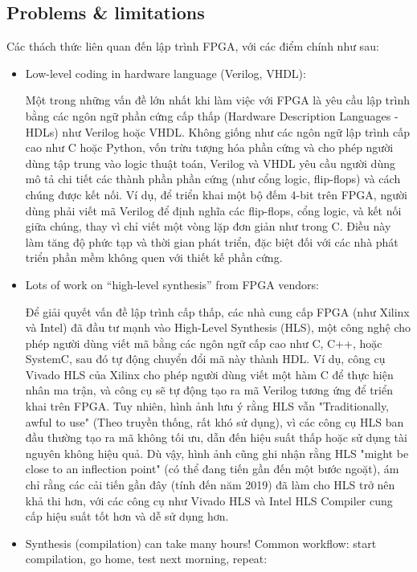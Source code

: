 \documentclass[a4paper]{article}
\begin{document}
\subsection{Problems \& limitations}
Các thách thức liên quan đến lập trình FPGA, với các điểm chính như sau:
\begin{itemize}
    \item Low-level coding in hardware language (Verilog, VHDL):\par Một trong những vấn đề lớn nhất khi làm việc với FPGA là yêu cầu lập trình bằng các ngôn ngữ phần cứng cấp thấp (Hardware Description Languages - HDLs) như Verilog hoặc VHDL. Không giống như các ngôn ngữ lập trình cấp cao như C hoặc Python, vốn trừu tượng hóa phần cứng và cho phép người dùng tập trung vào logic thuật toán, Verilog và VHDL yêu cầu người dùng mô tả chi tiết các thành phần phần cứng (như cổng logic, flip-flops) và cách chúng được kết nối. Ví dụ, để triển khai một bộ đếm 4-bit trên FPGA, người dùng phải viết mã Verilog để định nghĩa các flip-flops, cổng logic, và kết nối giữa chúng, thay vì chỉ viết một vòng lặp đơn giản như trong C. Điều này làm tăng độ phức tạp và thời gian phát triển, đặc biệt đối với các nhà phát triển phần mềm không quen với thiết kế phần cứng.
    \item Lots of work on “high-level synthesis” from FPGA vendors: \par Để giải quyết vấn đề lập trình cấp thấp, các nhà cung cấp FPGA (như Xilinx và Intel) đã đầu tư mạnh vào High-Level Synthesis (HLS), một công nghệ cho phép người dùng viết mã bằng các ngôn ngữ cấp cao như C, C++, hoặc SystemC, sau đó tự động chuyển đổi mã này thành HDL. Ví dụ, công cụ Vivado HLS của Xilinx cho phép người dùng viết một hàm C để thực hiện nhân ma trận, và công cụ sẽ tự động tạo ra mã Verilog tương ứng để triển khai trên FPGA. Tuy nhiên, hình ảnh lưu ý rằng HLS vẫn "Traditionally, awful to use" (Theo truyền thống, rất khó sử dụng), vì các công cụ HLS ban đầu thường tạo ra mã không tối ưu, dẫn đến hiệu suất thấp hoặc sử dụng tài nguyên không hiệu quả. Dù vậy, hình ảnh cũng ghi nhận rằng HLS "might be close to an inflection point" (có thể đang tiến gần đến một bước ngoặt), ám chỉ rằng các cải tiến gần đây (tính đến năm 2019) đã làm cho HLS trở nên khả thi hơn, với các công cụ như Vivado HLS và Intel HLS Compiler cung cấp hiệu suất tốt hơn và dễ sử dụng hơn.
    \item Synthesis (compilation) can take many hours! Common workflow: start compilation, go home, test next morning, repeat:\par

\end{itemize}
\end{document}
